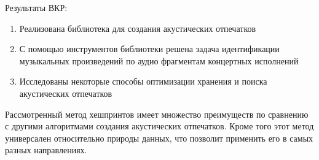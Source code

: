 \Conclusion %

Результаты ВКР:
\begin{enumerate}[label=\arabic*.]
    \item Реализована библиотека для создания акустических отпечатков
    \item С помощью инструментов библиотеки решена задача идентификации музыкальных
    произведений по аудио фрагментам концертных исполнений
    \item Исследованы некоторые способы оптимизации хранения и поиска акустических отпечатков
\end{enumerate}

Рассмотренный метод хешпринтов имеет множество преимуществ по сравнению
с другими алгоритмами создания акустических отпечатков.
Кроме того этот метод универсален относительно природы данных, что позволит
применить его в самых разных направлениях.
